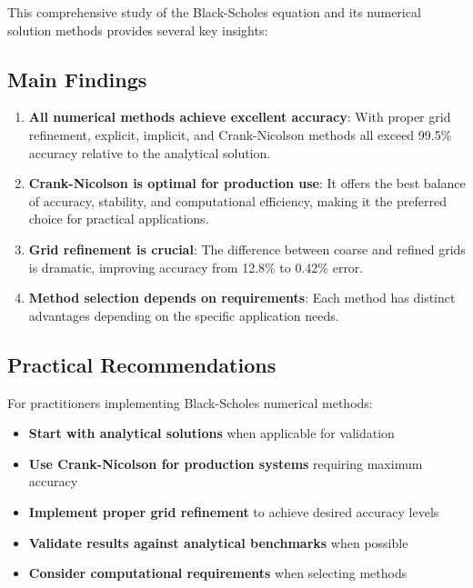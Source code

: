 \documentclass[12pt,a4paper]{article}
\numberwithin{algorithm}{subsection}
\begin{document}
This comprehensive study of the Black-Scholes equation and its numerical solution methods provides several key insights:

\subsection{Main Findings}

\begin{enumerate}
\item \textbf{All numerical methods achieve excellent accuracy}: With proper grid refinement, explicit, implicit, and Crank-Nicolson methods all exceed 99.5\% accuracy relative to the analytical solution.

\item \textbf{Crank-Nicolson is optimal for production use}: It offers the best balance of accuracy, stability, and computational efficiency, making it the preferred choice for practical applications.

\item \textbf{Grid refinement is crucial}: The difference between coarse and refined grids is dramatic, improving accuracy from 12.8\% to 0.42\% error.

\item \textbf{Method selection depends on requirements}: Each method has distinct advantages depending on the specific application needs.
\end{enumerate}

\subsection{Practical Recommendations}

For practitioners implementing Black-Scholes numerical methods:

\begin{itemize}
\item \textbf{Start with analytical solutions} when applicable for validation
\item \textbf{Use Crank-Nicolson for production systems} requiring maximum accuracy
\item \textbf{Implement proper grid refinement} to achieve desired accuracy levels
\item \textbf{Validate results against analytical benchmarks} when possible
\item \textbf{Consider computational requirements} when selecting methods
\end{itemize}
\end{document}
